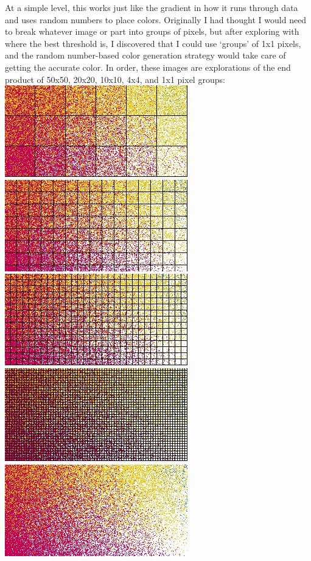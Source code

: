 \documentclass{article}
\begin{document}
\begin{multicols}{2}
\noindent
At a simple level, this works just like the gradient in how it runs through data and uses random numbers to place colors. Originally I had thought I would need to break whatever image or part into groups of pixels, but after exploring with where the best threshold is, I discovered that I could use `groups' of 1x1 pixels, and the random number-based color generation strategy would take care of getting the accurate color. In order, these images are explorations of the end product of 50x50, 20x20, 10x10, 4x4, and 1x1 pixel groups:
\\

\noindent
\includegraphics[width=.5\columnwidth]{slice_000_50px}
\includegraphics[width=.5\columnwidth]{slice_000_20px}
\includegraphics[width=.5\columnwidth]{slice_000_10px}
\includegraphics[width=.5\columnwidth]{slice_000_4px}
\includegraphics[width=\columnwidth]{slice_000_1px}


\end{multicols}
\end{document}
